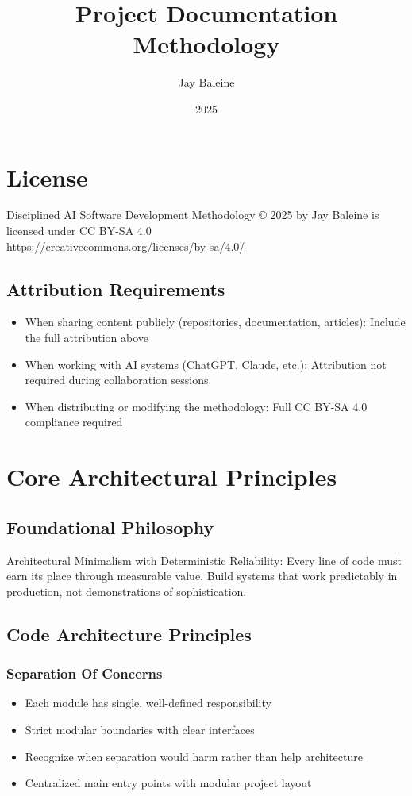 \documentclass{article}
\title{Project Documentation Methodology}
\author{Jay Baleine}
\date{2025}
\begin{document}
\maketitle

\section*{License}
Disciplined AI Software Development Methodology © 2025 by Jay Baleine is licensed under CC BY-SA 4.0 \\
\url{https://creativecommons.org/licenses/by-sa/4.0/}

\subsection*{Attribution Requirements}
\begin{itemize}[noitemsep]
\item When sharing content publicly (repositories, documentation, articles): Include the full attribution above
\item When working with AI systems (ChatGPT, Claude, etc.): Attribution not required during collaboration sessions
\item When distributing or modifying the methodology: Full CC BY-SA 4.0 compliance required
\end{itemize}

\section{Core Architectural Principles}

\subsection{Foundational Philosophy}
Architectural Minimalism with Deterministic Reliability: Every line of code must earn its place through measurable value. Build systems that work predictably in production, not demonstrations of sophistication.

\subsection{Code Architecture Principles}

\subsubsection{Separation Of Concerns}
\begin{itemize}[noitemsep]
\item Each module has single, well-defined responsibility
\item Strict modular boundaries with clear interfaces
\item Recognize when separation would harm rather than help architecture
\item Centralized main entry points with modular project layout
\end{itemize}
\end{document}

